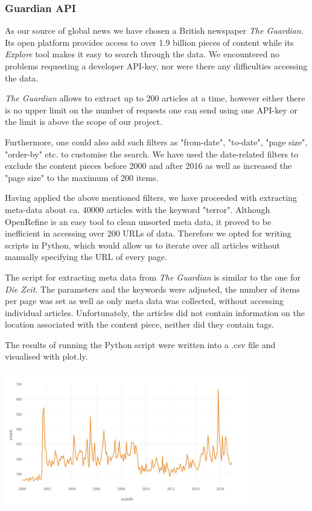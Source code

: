 \subsubsection{Guardian API}
\label{sec:guardian-api}

As our source of global news we have chosen a British newspaper \textit{The Guardian}. Its open platform provides access to over 1.9 billion pieces of content while its \textit{Explore} tool makes it easy to search through the data. We encountered no problems requesting a developer API-key, nor were there any difficulties accessing the data. 

\textit{The Guardian} allows to extract up to 200 articles at a time, however either there is no upper limit on the number of requests one can send using one API-key or the limit is above the scope of our project.

Furthermore, one could also add such filters as "from-date", "to-date", "page size", "order-by" etc. to customise the search. We have used the date-related filters to exclude the content pieces before 2000 and after 2016 as well as increased the "page size" to the maximum of 200 items. 

Having applied the above mentioned filters, we have proceeded with extracting meta-data about ca. 40000 articles with the keyword "terror". Although OpenRefine is an easy tool to clean unsorted meta data, it proved to be inefficient in accessing over 200 URLs of data. Therefore we opted for writing scripts in Python, which would allow us to iterate over all articles without manually specifying the URL of every page. 

The script for extracting meta data from \textit{The Guardian} is similar to the one for \textit{Die Zeit}. The parameters and the keywords were adjusted, the number of items per page was set as well as only meta data was collected, without accessing individual articles. Unfortunately, the articles did not contain information on the location associated with the content piece, neither did they contain tags. 

The results of running the Python script were written into a .csv file and visualised with plot.ly.

\begin{center}
  \includegraphics[width=0.8\textwidth]{graph_guardian_articles}
\end{center}


